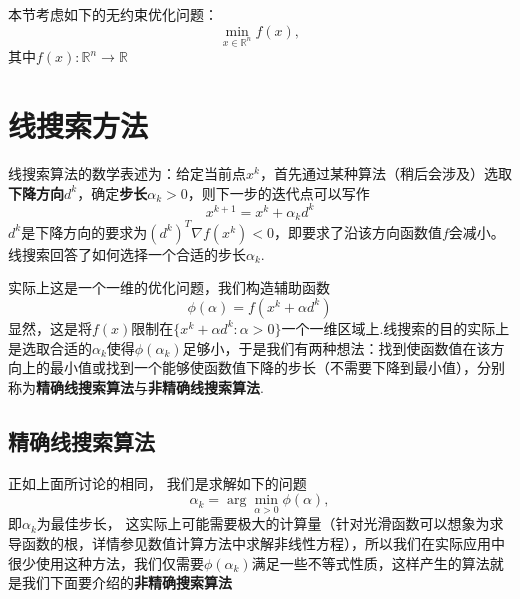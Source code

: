本节考虑如下的无约束优化问题：
\begin{equation}\label{ucp}
	\min\limits_{x\in\mathbb{R}^n} f(x),
\end{equation}
其中$f(x): \mathbb{R}^n\to\mathbb{R}$
\section{线搜索方法}
线搜索算法的数学表述为：给定当前点$x^k$，首先通过某种算法（稍后会涉及）选取\textbf{下降方向}$d^k$，确定\textbf{步长}$\alpha_k>0$，则下一步的迭代点可以写作
\begin{equation}\label{iter}
	x^{k+1} = x^k + \alpha_k d^k
\end{equation}
$d^k$是下降方向的要求为$(d^k)^T\nabla f(x^k)<0$，即要求了沿该方向函数值$f$会减小。线搜索回答了如何选择一个合适的步长$\alpha_k$.\par
实际上这是一个一维的优化问题，我们构造辅助函数
\begin{equation*}
	\phi(\alpha) = f(x^k+\alpha d^k)
\end{equation*}
显然，这是将$f(x)$限制在$\{x^k+\alpha d^k: \alpha > 0\}$一个一维区域上.线搜索的目的实际上是选取合适的$\alpha_k$使得$\phi(\alpha_k)$足够小，于是我们有两种想法：找到使函数值在该方向上的最小值或找到一个能够使函数值下降的步长（不需要下降到最小值），分别称为\textbf{精确线搜索算法}与\textbf{非精确线搜索算法}.
\subsection{精确线搜索算法}
正如上面所讨论的相同， 我们是求解如下的问题
\begin{equation*}
	\alpha_k = \arg \min\limits_{\alpha>0} \phi(\alpha),
\end{equation*}
即$\alpha_k$为最佳步长， 这实际上可能需要极大的计算量（针对光滑函数可以想象为求导函数的根，详情参见数值计算方法中求解非线性方程），所以我们在实际应用中很少使用这种方法，我们仅需要$\phi(\alpha_k)$满足一些不等式性质，这样产生的算法就是我们下面要介绍的\textbf{非精确搜索算法}
